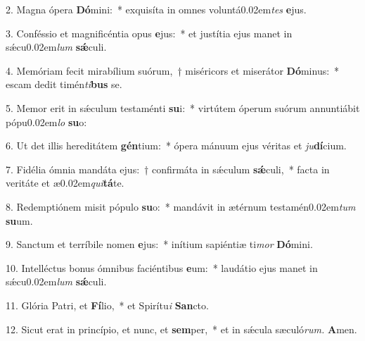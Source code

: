 \item 2. Magna ópera \textbf{Dó}mini:~* exquisíta in omnes voluntá\kern0.02em\textit{tes} \textbf{e}jus.
\item 3. Conféssio et magnificéntia opus \textbf{e}jus:~* et justítia ejus manet in sǽcu\kern0.02em\textit{lum} \textbf{sǽ}culi.
\item 4. Memóriam fecit mirabílium suórum,~† miséricors et miserátor \textbf{Dó}minus:~* escam dedit timén\textit{ti}\textbf{bus} se.
\item 5. Memor erit in sǽculum testaménti \textbf{su}i:~* virtútem óperum suórum annuntiábit pópu\kern0.02em\textit{lo} \textbf{su}o:
\item 6. Ut det illis hereditátem \textbf{gén}tium:~* ópera mánuum ejus véritas et \textit{ju}\textbf{dí}cium.
\item 7. Fidélia ómnia mandáta ejus:~† confirmáta in sǽculum \textbf{sǽ}culi,~* facta in veritáte et æ\kern0.02em\textit{qui}\textbf{tá}te.
\item 8. Redemptiónem misit pópulo \textbf{su}o:~* mandávit in ætérnum testamén\kern0.02em\textit{tum} \textbf{su}um.
\item 9. Sanctum et terríbile nomen \textbf{e}jus:~* inítium sapiéntiæ ti\textit{mor} \textbf{Dó}mini.
\item 10. Intelléctus bonus ómnibus faciéntibus \textbf{e}um:~* laudátio ejus manet in sǽcu\kern0.02em\textit{lum} \textbf{sǽ}culi.
\item 11. Glória Patri, et \textbf{Fí}lio,~* et Spirítu\hspace{0.03em}\textit{i} \textbf{San}cto.
\item 12. Sicut erat in princípio, et nunc, et \textbf{sem}per,~* et in sǽcula sæculó\textit{rum.} \textbf{A}men.


